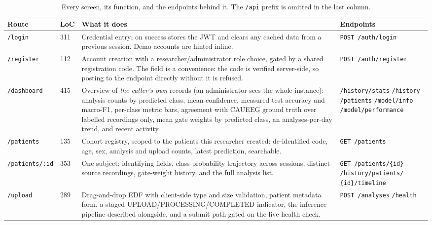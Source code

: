 \documentclass[11pt,a4paper]{article}
\newcommand{\code}[1]{\texttt{#1}}
\begin{document}
\begin{table}[H]\centering\caption{Every screen, its function, and the endpoints behind it. The \code{/api} prefix is omitted in the last column.}
\label{tab:pages}\scriptsize\renewcommand{\arraystretch}{1.15}
\begin{tabularx}{\linewidth}{@{}L{2.5cm} C{0.7cm} Y L{3.5cm}@{}}
\toprule
\textbf{Route} & \textbf{LoC} & \textbf{What it does} & \textbf{Endpoints} \\
\midrule
\code{/login} & 311 & Credential entry; on success stores the JWT and clears any cached data from a previous session. Demo accounts are hinted inline. & \code{POST /auth/login} \\
\code{/register} & 112 & Account creation with a researcher/administrator role choice, gated by a shared registration code. The field is a convenience: the code is verified server-side, so posting to the endpoint directly without it is refused. & \code{POST /auth/register} \\
\code{/dashboard} & 415 & Overview of \emph{the caller's own} records (an administrator sees the whole instance): analysis counts by predicted class, mean confidence, measured test accuracy and macro-F1, per-class metric bars, agreement with CAUEEG ground truth over labelled recordings only, mean gate weights by predicted class, an analyses-per-day trend, and recent activity. & \code{/history/stats} \newline \code{/history} \newline \code{/patients} \newline \code{/model/info} \newline \code{/model/performance} \\
\code{/patients} & 135 & Cohort registry, scoped to the patients this researcher created: de-identified code, age, sex, analysis and upload counts, latest prediction, searchable. & \code{GET /patients} \\
\code{/patients/:id} & 353 & One subject: identifying fields, class-probability trajectory across sessions, distinct source recordings, gate-weight history, and the full analysis list. & \code{GET /patients/\{id\}} \newline \code{/history/patients/} \code{\{id\}/timeline} \\
\code{/upload} & 289 & Drag-and-drop EDF with client-side type and size validation, patient metadata form, a staged UPLOAD/PROCESSING/COMPLETED indicator, the inference pipeline described alongside, and a submit path gated on the live health check. & \code{POST /analyses} \newline \code{/health} \\

\end{tabularx}
\end{table}
\end{document}
